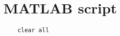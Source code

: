 \chapter{MATLAB script}
\label{chapter:MATLAB_script}

\begin{lstlisting}
    clear all
\end{lstlisting}


